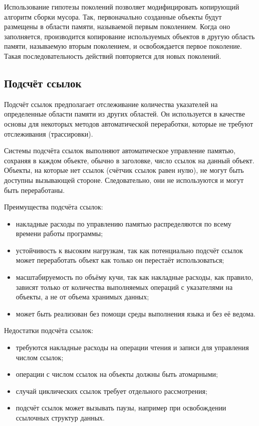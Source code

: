 
Использование гипотезы поколений позволяет модифицировать копирующий алгоритм сборки мусора. Так, первоначально созданные объекты будут размещены в области памяти, называемой первым поколением. Когда оно заполняется, производится копирование используемых объектов в другую область памяти, называемую вторым поколением, и освобождается первое поколение. Такая последовательность действий повторяется для новых поколений. \cite{cornell3}



\subsection{Подсчёт ссылок}

Подсчёт ссылок предполагает отслеживание количества указателей на определенные области памяти из других областей. Он используется в качестве основы для некоторых методов автоматической переработки, которые не требуют отслеживания (трассировки). \cite{recycling}

Системы подсчёта ссылок выполняют автоматическое управление памятью, сохраняя в каждом объекте, обычно в заголовке, число ссылок на данный объект. Объекты, на которые нет ссылок (счётчик ссылок равен нулю), не могут быть доступны вызывающей стороне. Следовательно, они не используются и могут быть переработаны. \cite{glossary}

Преимущества подсчёта ссылок:

\begin{itemize}[label*=---]
	\item накладные расходы по управлению памятью распределяются по всему времени работы программы; \cite{handbook}
	\item устойчивость к высоким нагрузкам, так как потенциально подсчёт ссылок может переработать объект как только он перестаёт использоваться; \cite{handbook}
	\item масштабируемость по объёму кучи, так как накладные расходы, как правило, зависят только от количества выполняемых операций с указателями на объекты, а не от объема хранимых данных; \cite{handbook}
	\item может быть реализован без помощи среды выполнения языка и без её ведома. \cite{handbook}
\end{itemize}

Недостатки подсчёта ссылок:

\begin{itemize}[label*=---]
	\item требуются накладные расходы на операции чтения и записи для управления числом ссылок;
	\item операции с числом ссылок на объекты должны быть атомарными; \cite{handbook}
	\item случай циклических ссылок требует отдельного рассмотрения; \cite{handbook}
	\item подсчёт ссылок может вызывать паузы, например при освобождении ссылочных структур данных. \cite{handbook}
\end{itemize}

